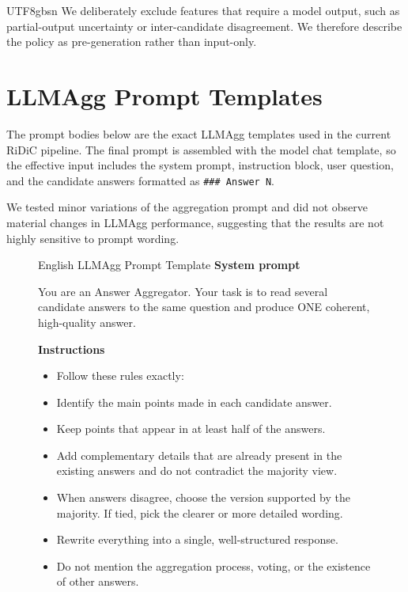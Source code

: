 \documentclass[11pt]{article}
\begin{document}
\begin{CJK*}{UTF8}{gbsn}
We deliberately exclude features that require a model output, such as partial-output uncertainty or inter-candidate disagreement. We therefore describe the policy as pre-generation rather than input-only.



\section{LLMAgg Prompt Templates}

The prompt bodies below are the exact LLMAgg templates used in the current RiDiC pipeline. The final prompt is assembled with the model chat template, so the effective input includes the system prompt, instruction block, user question, and the candidate answers formatted as \verb|### Answer N|.

We tested minor variations of the aggregation prompt and did not observe material changes in LLMAgg performance, suggesting that the results are not highly sensitive to prompt wording.

\begin{figure}[htbp!]
\centering
\begin{minipage}{0.98\textwidth}
\begin{PromptBox}{English LLMAgg Prompt Template}
\textbf{System prompt}

You are an Answer Aggregator. Your task is to read several candidate answers to the same question and produce ONE coherent, high-quality answer.

\smallskip
\textbf{Instructions}
\begin{itemize}
  \item Follow these rules exactly:
  \item Identify the main points made in each candidate answer.
  \item Keep points that appear in at least half of the answers.
  \item Add complementary details that are already present in the existing answers and do not contradict the majority view.
  \item When answers disagree, choose the version supported by the majority. If tied, pick the clearer or more detailed wording.
  \item Rewrite everything into a single, well-structured response.
  \item Do not mention the aggregation process, voting, or the existence of other answers.
\end{itemize}


\end{PromptBox}
\end{minipage}
\end{figure}
\end{CJK*}
\end{document}
